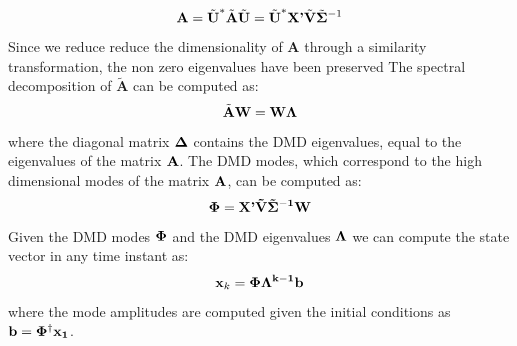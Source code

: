 \documentclass[]{article}
\begin{document}
\begin{equation}\label{atilde}
    \textbf{A} = \tilde{\textbf{U}}^* \tilde{\textbf{A}} \tilde{\textbf{U}} = \tilde{\textbf{U}}^* \textbf{X'} \tilde{\textbf{V}} \tilde{\bf{\Sigma}}^{-1}
\end{equation}
Since we reduce reduce the dimensionality of $\textbf{A}$ through a similarity transformation, the non zero eigenvalues have been preserved The spectral decomposition of $\tilde{\textbf{A}}$ can be computed as:
\begin{equation}\label{specdec}
    \tilde{\textbf{A}} \textbf{W} = \textbf{W} \bf{\Lambda} 
\end{equation}
where the diagonal matrix $\bf{\Delta}$ contains the DMD eigenvalues, equal to the eigenvalues of the matrix $\textbf A$. The DMD modes, which correspond to the high dimensional modes of the matrix $\textbf A$, can be computed as:
\begin{equation}\label{specdec}
    \bf{\Phi} = \textbf{X'} \tilde{\textbf{V}} \tilde{\bf{\Sigma}}^{-1} \textbf{W}
\end{equation}
Given the DMD modes $\bf{\Phi}$ and the DMD eigenvalues $\bf{\Lambda}$ we can compute the state vector in any time instant as:
\begin{equation}
    \textbf{x}_k = \bf{\Phi}\bf{\Lambda}^{k-1} \textbf{b} 
\end{equation}
where the mode amplitudes are computed given the initial conditions as $\textbf{b} = \bf{\Phi}^\dagger\textbf{x}_1$. 
\end{document}

